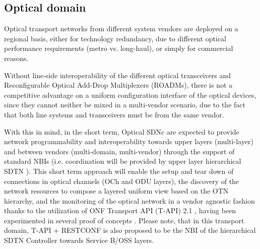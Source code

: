 \documentclass[10pt, conference]{IEEEtran}
\begin{document}
\subsection{Optical domain}
\label{section:dwdm}
Optical transport networks from different system vendors are deployed on a regional basis, either for technology redundancy, due to different optical performance requirements (metro vs. long-haul), or simply for commercial reasons. 

Without line-side interoperability of the different optical transceivers and Reconfigurable Optical Add-Drop Multiplexers (ROADMs), there is not a competitive advantage on a uniform configuration interface of the optical devices, since they cannot neither be mixed in a multi-vendor scenario, due to the fact that both line systems and transceivers must be from the same vendor.

With this in mind, in the short term, Optical SDNc are expected to provide network programmability and interoperability towards upper layers (multi-layer) and between vendors (multi-domain, multi-vendor) through the support of standard NBIs (i.e. coordination will be provided by upper layer hierarchical SDTN ). This short term approach will enable the setup and tear down of connections in optical channels (OCh and ODU layers), the discovery of the network resources to compose a layered uniform view based on the OTN hierarchy, and the monitoring of the optical network in a vendor agnostic fashion thanks to the utilization of ONF Transport API (T-API) 2.1 \cite{lopez2016transport}, having been experimented in several proof of concepts \cite{mayoral2016first}. Please note, that in this transport domain, T-API + RESTCONF is also proposed to be the NBI of the hierarchical SDTN Controller towards Service B/OSS layers.

\end{document}
